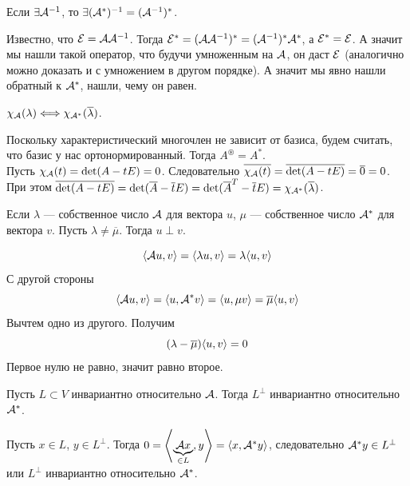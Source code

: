\documentclass{article}
\newcommand*{\id}{{\scriptE}}
\begin{document}
\begin{itemize}
\begin{Proof}
        \end{Proof}
        \thm Если $\exists{\mathcal{A}}^{-1}$, то $\exists({\mathcal{A}}^*)^{-1}=({\mathcal{A}}^{-1})^*$.
        \begin{Proof}
            Известно, что $\id=\scriptA\scriptA^{-1}$. Тогда $\id^*=(\scriptA\scriptA^{-1})^*=(\scriptA^{-1})^*\scriptA^*$, а $\id^*=\id$. А значит мы нашли такой оператор, что будучи умноженным на ${\mathcal{A}}$, он даст $\id$ (аналогично можно доказать и с умножением в другом порядке). А значит мы явно нашли обратный к ${\mathcal{A}}^*$, нашли, чему он равен.
        \end{Proof}
        \thm $\chi_{\mathcal{A}}(\lambda)\Longleftrightarrow\chi_{{\mathcal{A}}^*}(\overline\lambda)$.
        \begin{Proof}
            Поскольку характеристический многочлен не зависит от базиса, будем считать, что базис у нас ортонормированный. Тогда $A^\circledast=A^*$.\\
            Пусть $\chi_{\mathcal{A}}(t)=\det(A-tE)=0$. Следовательно $\overline{\chi_{\mathcal{A}}(t)}=\overline{\det(A-tE)}=\overline0=0$. При этом $\overline{\det(A-tE)}=\det(\overline A-\overline tE)=\det({\overline A}^T-\overline tE)=\chi_{{\mathcal{A}}^*}(\overline\lambda)$.
        \end{Proof}
        \thm Если $\lambda$ --- собственное число ${\mathcal{A}}$ для вектора $u$, $\mu$ --- собственное число ${\mathcal{A}}^*$ для вектора $v$. Пусть $\lambda\neq\overline\mu$. Тогда $u\perp v$.
        \begin{Proof}
            $$
            {\left\langle{{\mathcal{A}}u},{v}\right\rangle}={\left\langle{\lambda u},{v}\right\rangle}=\lambda{\left\langle{u},{v}\right\rangle}
            $$
            С другой стороны
            $$
            {\left\langle{{\mathcal{A}}u},{v}\right\rangle}={\left\langle{u},{{\mathcal{A}}^*v}\right\rangle}={\left\langle{u},{\mu v}\right\rangle}=\overline\mu{\left\langle{u},{v}\right\rangle}
            $$
            Вычтем одно из другого. Получим
            $$
            (\lambda-\overline\mu){\left\langle{u},{v}\right\rangle}=0
            $$
            Первое нулю не равно, значит равно второе.
        \end{Proof}
        \thm Пусть $L\subset V$ инвариантно относительно ${\mathcal{A}}$. Тогда $L^\perp$ инвариантно относительно ${\mathcal{A}}^*$.
        \begin{Proof}
            Пусть $x\in L$, $y\in L^\perp$. Тогда $0={\left\langle{\underbrace{{\mathcal{A}}x}_{\in L}},{y}\right\rangle}={\left\langle{x},{{\mathcal{A}}^*y}\right\rangle}$, следовательно ${\mathcal{A}}^*y\in L^\perp$ или $L^\perp$ инвариантно относительно ${\mathcal{A}}^*$.
        \end{Proof}
    \end{itemize}
\end{document}
